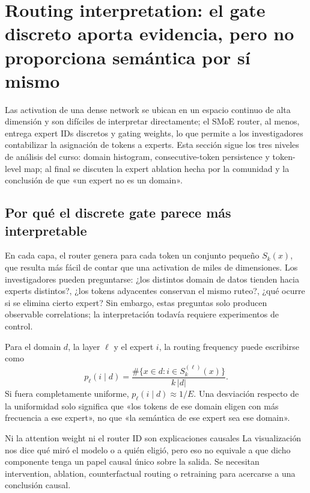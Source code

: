 \section{Routing interpretation: el gate discreto aporta evidencia, pero no proporciona semántica por sí mismo}

Las activation de una dense network se ubican en un espacio continuo de alta dimensión y son difíciles de interpretar directamente; el SMoE router, al menos, entrega expert IDs discretos y gating weights, lo que permite a los investigadores contabilizar la asignación de tokens a experts. Esta sección sigue los tres niveles de análisis del curso: domain histogram, consecutive-token persistence y token-level map; al final se discuten la expert ablation hecha por la comunidad y la conclusión de que «un expert no es un domain».

\subsection{Por qué el discrete gate parece más interpretable}

En cada capa, el router genera para cada token un conjunto pequeño $S_k(x)$, que resulta más fácil de contar que una activation de miles de dimensiones. Los investigadores pueden preguntarse: ¿los distintos domain de datos tienden hacia experts distintos?, ¿los tokens adyacentes conservan el mismo ruteo?, ¿qué ocurre si se elimina cierto expert? Sin embargo, estas preguntas solo producen observable correlations; la interpretación todavía requiere experimentos de control.


Para el domain $d$, la layer $\ell$ y el expert $i$, la routing frequency puede escribirse como
\[
p_{\ell}(i\mid d)=\frac{\#\{x\in d:i\in S_k^{(\ell)}(x)\}}{k\,|d|}.
\]
Si fuera completamente uniforme, $p_{\ell}(i\mid d)\approx 1/E$. Una desviación respecto de la uniformidad solo significa que «los tokens de ese domain eligen con más frecuencia a ese expert», no que «la semántica de ese expert sea ese domain».

\begin{warningbox}{Ni la attention weight ni el router ID son explicaciones causales}
La visualización nos dice qué miró el modelo o a quién eligió, pero eso no equivale a que dicho componente tenga un papel causal único sobre la salida. Se necesitan intervention, ablation, counterfactual routing o retraining para acercarse a una conclusión causal.
\end{warningbox}

